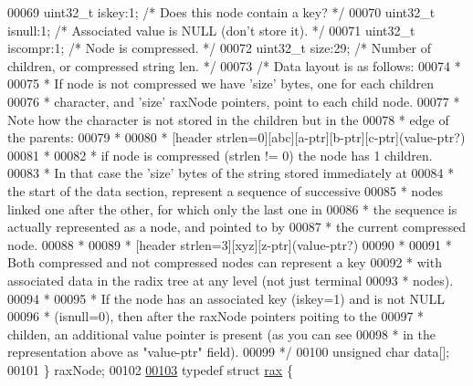 \begin{DoxyCode}
00069     uint32\_t iskey:1;     \textcolor{comment}{/* Does this node contain a key? */}
00070     uint32\_t isnull:1;    \textcolor{comment}{/* Associated value is NULL (don't store it). */}
00071     uint32\_t iscompr:1;   \textcolor{comment}{/* Node is compressed. */}
00072     uint32\_t size:29;     \textcolor{comment}{/* Number of children, or compressed string len. */}
00073     \textcolor{comment}{/* Data layout is as follows:}
00074 \textcolor{comment}{     *}
00075 \textcolor{comment}{     * If node is not compressed we have 'size' bytes, one for each children}
00076 \textcolor{comment}{     * character, and 'size' raxNode pointers, point to each child node.}
00077 \textcolor{comment}{     * Note how the character is not stored in the children but in the}
00078 \textcolor{comment}{     * edge of the parents:}
00079 \textcolor{comment}{     *}
00080 \textcolor{comment}{     * [header strlen=0][abc][a-ptr][b-ptr][c-ptr](value-ptr?)}
00081 \textcolor{comment}{     *}
00082 \textcolor{comment}{     * if node is compressed (strlen != 0) the node has 1 children.}
00083 \textcolor{comment}{     * In that case the 'size' bytes of the string stored immediately at}
00084 \textcolor{comment}{     * the start of the data section, represent a sequence of successive}
00085 \textcolor{comment}{     * nodes linked one after the other, for which only the last one in}
00086 \textcolor{comment}{     * the sequence is actually represented as a node, and pointed to by}
00087 \textcolor{comment}{     * the current compressed node.}
00088 \textcolor{comment}{     *}
00089 \textcolor{comment}{     * [header strlen=3][xyz][z-ptr](value-ptr?)}
00090 \textcolor{comment}{     *}
00091 \textcolor{comment}{     * Both compressed and not compressed nodes can represent a key}
00092 \textcolor{comment}{     * with associated data in the radix tree at any level (not just terminal}
00093 \textcolor{comment}{     * nodes).}
00094 \textcolor{comment}{     *}
00095 \textcolor{comment}{     * If the node has an associated key (iskey=1) and is not NULL}
00096 \textcolor{comment}{     * (isnull=0), then after the raxNode pointers poiting to the}
00097 \textcolor{comment}{     * childen, an additional value pointer is present (as you can see}
00098 \textcolor{comment}{     * in the representation above as "value-ptr" field).}
00099 \textcolor{comment}{     */}
00100     \textcolor{keywordtype}{unsigned} \textcolor{keywordtype}{char} data[];
00101 \} raxNode;
00102 
\hyperlink{structrax}{00103} \textcolor{keyword}{typedef} \textcolor{keyword}{struct} \hyperlink{structrax}{rax} \{

\end{DoxyCode}
